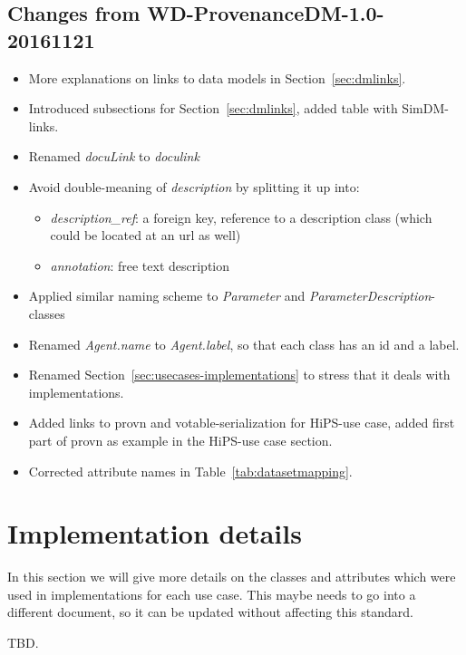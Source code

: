 \documentclass[11pt,a4paper]{ivoa}
\begin{document}
\subsection{Changes from WD-ProvenanceDM-1.0-20161121}
\begin{itemize}
\item More explanations on links to data models in Section~\ref{sec:dmlinks}.
\item Introduced subsections for Section~\ref{sec:dmlinks}, added table with SimDM-links.
\item Renamed \emph{docuLink} to \emph{doculink}
\item Avoid double-meaning of \emph{description} by splitting it up into: 
    \begin{itemize}
    \item \emph{description\_ref}: a foreign key, reference to a description class 
(which could be located at an url as well)
    \item \emph{annotation}: free text description
    \end{itemize}
\item Applied similar naming scheme to \emph{Parameter} and \emph{ParameterDescription}-classes
\item Renamed \emph{Agent.name} to \emph{Agent.label}, so that each class has an id and a label.
\item Renamed Section~\ref{sec:usecases-implementations} to stress that it deals with implementations.
\item Added links to provn and votable-serialization for HiPS-use case, added first part of provn as example in the HiPS-use case section.
\item Corrected attribute names in Table~\ref{tab:datasetmapping}.

\end{itemize}


\section{Implementation details}\label{sec:implementation-details}
In this section we will give more details on the classes and attributes which were used 
in implementations for each use case. This maybe needs to go into a different document, so it can 
be updated without affecting this standard.

TBD.



\end{document}
